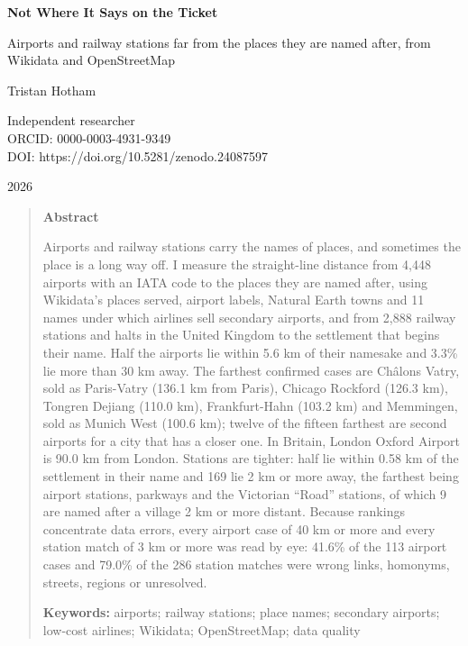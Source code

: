 \documentclass[11pt,a4paper]{article}
\begin{document}
\begin{center}
{\Large\bfseries Not Where It Says on the Ticket\par}
\vspace{0.4em}
{\large Airports and railway stations far from the places they are named after, from Wikidata and OpenStreetMap\par}
\vspace{1.2em}
{\large Tristan Hotham\par}
\vspace{0.3em}
{\small Independent researcher\\
ORCID: 0000-0003-4931-9349\\
DOI: https://doi.org/10.5281/zenodo.24087597\par}
\vspace{0.8em}
2026
\end{center}

\begin{quote}
\small
\begin{center}\textbf{Abstract}\end{center}
Airports and railway stations carry the names of places, and sometimes the place is a long way off. I measure the straight-line distance from 4,448 airports with an IATA code to the places they are named after, using Wikidata's places served, airport labels, Natural Earth towns and 11 names under which airlines sell secondary airports, and from 2,888 railway stations and halts in the United Kingdom to the settlement that begins their name. Half the airports lie within 5.6 km of their namesake and 3.3\% lie more than 30 km away. The farthest confirmed cases are Châlons Vatry, sold as Paris-Vatry (136.1 km from Paris), Chicago Rockford (126.3 km), Tongren Dejiang (110.0 km), Frankfurt-Hahn (103.2 km) and Memmingen, sold as Munich West (100.6 km); twelve of the fifteen farthest are second airports for a city that has a closer one. In Britain, London Oxford Airport is 90.0 km from London. Stations are tighter: half lie within 0.58 km of the settlement in their name and 169 lie 2 km or more away, the farthest being airport stations, parkways and the Victorian ``Road'' stations, of which 9 are named after a village 2 km or more distant. Because rankings concentrate data errors, every airport case of 40 km or more and every station match of 3 km or more was read by eye: 41.6\% of the 113 airport cases and 79.0\% of the 286 station matches were wrong links, homonyms, streets, regions or unresolved.

\textbf{Keywords:} airports; railway stations; place names; secondary airports; low-cost airlines; Wikidata; OpenStreetMap; data quality
\end{quote}
\end{document}
